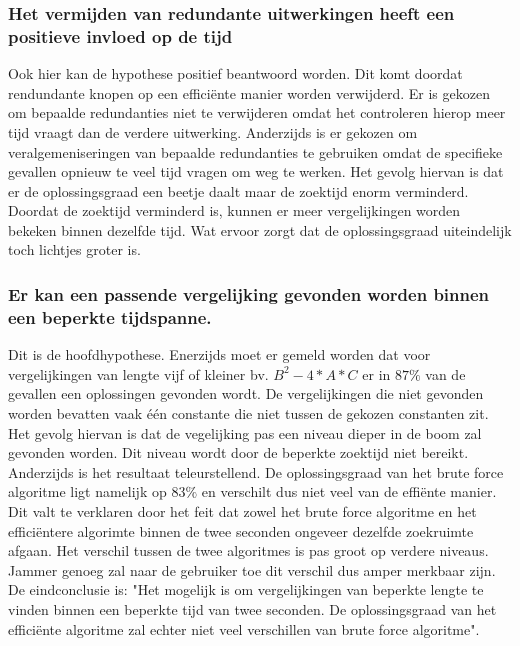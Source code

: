 \documentclass[Main.tex]{subfiles}
\begin{document}
\subsubsection{Het vermijden van redundante uitwerkingen heeft een positieve invloed op de tijd}
Ook hier kan de hypothese positief beantwoord worden. Dit komt doordat rendundante knopen op een effici\"ente manier worden verwijderd. Er is gekozen om bepaalde redundanties niet te verwijderen omdat het controleren hierop meer tijd vraagt dan de verdere uitwerking. Anderzijds is er gekozen om veralgemeniseringen van bepaalde redundanties te gebruiken omdat de specifieke gevallen opnieuw te veel tijd vragen om weg te werken. Het gevolg hiervan is dat er de oplossingsgraad een beetje daalt maar de zoektijd enorm verminderd. Doordat de zoektijd verminderd is, kunnen er meer vergelijkingen worden bekeken binnen dezelfde tijd. Wat ervoor zorgt dat de oplossingsgraad uiteindelijk toch lichtjes groter is.
\subsubsection{Er kan een passende vergelijking gevonden worden binnen een beperkte tijdspanne.}
Dit is de hoofdhypothese. Enerzijds moet er gemeld worden dat voor vergelijkingen van lengte vijf of kleiner bv. $B^{2} - 4 \ast A \ast C$ er in $87\%$ van de gevallen een oplossingen gevonden wordt. De vergelijkingen die niet gevonden worden bevatten vaak \'e\'en constante die niet tussen de gekozen constanten zit. Het gevolg hiervan is dat de vegelijking pas een niveau dieper in de boom zal gevonden worden. Dit niveau wordt door de beperkte zoektijd niet bereikt. Anderzijds is het resultaat teleurstellend. De oplossingsgraad van het brute force algoritme ligt namelijk op $83\%$ en verschilt dus niet veel van de effi\"ente manier. Dit valt te verklaren door het feit dat zowel het brute force algoritme en het effici\"entere algorimte binnen de twee seconden ongeveer dezelfde zoekruimte afgaan. Het verschil tussen de twee algoritmes is pas groot op verdere niveaus. Jammer genoeg zal naar de gebruiker toe dit verschil dus amper merkbaar zijn. De eindconclusie is: "Het mogelijk is om vergelijkingen van beperkte lengte te vinden binnen een beperkte tijd van twee seconden. De oplossingsgraad van het effici\"ente algoritme zal echter niet veel verschillen van brute force algoritme".
\end{document}
